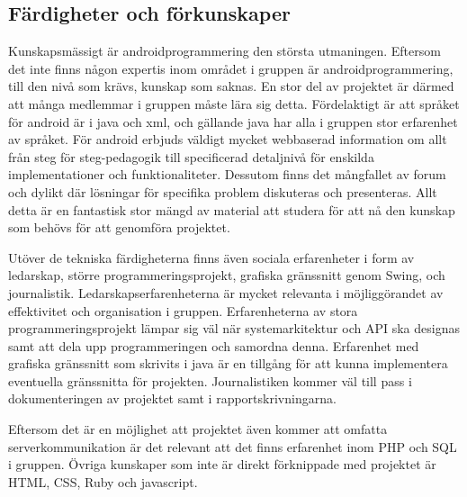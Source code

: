 \subsection{Färdigheter och förkunskaper}
Kunskapsmässigt är androidprogrammering den största utmaningen. Eftersom det inte finns någon expertis inom området i gruppen är androidprogrammering, till den nivå som krävs, kunskap som saknas. En stor del av projektet är därmed att många medlemmar i gruppen måste lära sig detta. Fördelaktigt är att språket för android är i java och xml, och gällande java har alla i gruppen stor erfarenhet av språket. För android erbjuds väldigt mycket webbaserad information om allt från steg för steg-pedagogik till specificerad detaljnivå för enskilda implementationer och funktionaliteter. Dessutom finns det mångfallet av forum och dylikt där lösningar för specifika problem diskuteras och presenteras. Allt detta är en fantastisk stor mängd av material att studera för att nå den kunskap som behövs för att genomföra projektet.

Utöver de tekniska färdigheterna finns även sociala erfarenheter i form av ledarskap, större programmeringsprojekt, grafiska gränssnitt genom Swing, och journalistik.  Ledarskapserfarenheterna är mycket relevanta i möjliggörandet av effektivitet och organisation i gruppen. Erfarenheterna av stora programmeringsprojekt lämpar sig väl när systemarkitektur och API ska designas samt att dela upp programmeringen och samordna denna. Erfarenhet med grafiska gränssnitt som skrivits i java är en tillgång för att kunna implementera eventuella gränssnitta för projekten. Journalistiken kommer väl till pass i dokumenteringen av projektet samt i rapportskrivningarna. 

Eftersom det är en möjlighet att projektet även kommer att omfatta serverkommunikation är det relevant att det finns erfarenhet inom PHP och SQL i gruppen. Övriga kunskaper som inte är direkt förknippade med projektet är HTML, CSS, Ruby och javascript.
